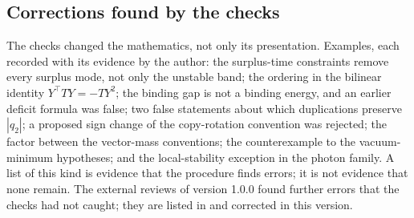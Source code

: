 \subsection{Corrections found by the checks}

The checks changed the mathematics, not only its presentation. Examples, each recorded with its evidence by the author: the
surplus-time constraints remove every surplus mode, not only the unstable band; the ordering in the bilinear identity
$Y^{\!\top}TY=-TY^2$; the binding gap is not a binding energy, and an earlier deficit formula was false; two false statements
about which duplications preserve $|q_2|$; a proposed sign change of the copy-rotation convention was rejected; the factor between
the vector-mass conventions; the counterexample to the vacuum-minimum hypotheses; and the local-stability exception in the
photon family. A list of this kind is evidence that the procedure finds errors; it is not evidence that none remain. The external reviews of
version 1.0.0 found further errors that the checks had not caught; they are listed in  and corrected in this version.
